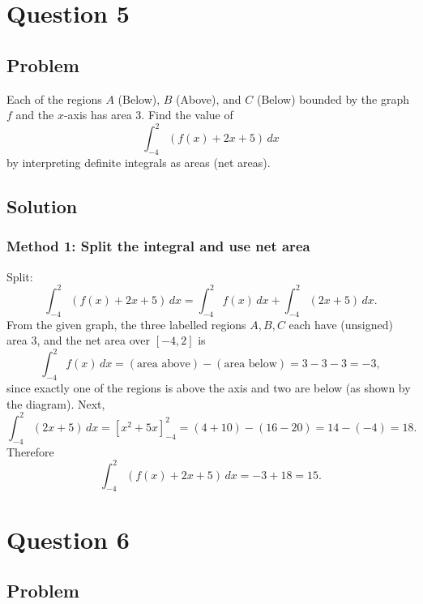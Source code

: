 \documentclass[12pt]{article}
\begin{document}
\bigskip


\newpage

\section*{Question 5}

\subsection*{Problem}

Each of the regions \(A\) (Below), \(B\) (Above), and \(C\) (Below) bounded by the graph \(f\) and the \(x\)-axis has area \(3\).
Find the value of
\[
\int_{-4}^{2} \left(f(x) + 2x + 5\right)\,dx
\]
by interpreting definite integrals as areas (net areas).

\subsection*{Solution}

\subsubsection*{Method 1: Split the integral and use net area}

Split:
\[
\int_{-4}^{2}\left(f(x)+2x+5\right)\,dx
=\int_{-4}^{2} f(x)\,dx + \int_{-4}^{2}(2x+5)\,dx.
\]
From the given graph, the three labelled regions \(A,B,C\) each have (unsigned) area \(3\), and the net area over \([-4,2]\) is
\[
\int_{-4}^{2} f(x)\,dx = (\text{area above})-(\text{area below})=3-3-3=-3,
\]
since exactly one of the regions is above the axis and two are below (as shown by the diagram).
Next,
\[
\int_{-4}^{2}(2x+5)\,dx = \left[x^2+5x\right]_{-4}^{2} = (4+10)-(16-20)=14-(-4)=18.
\]
Therefore
\[
\int_{-4}^{2} \left(f(x) + 2x + 5\right)\,dx = -3+18 = 15.
\]

\bigskip


\newpage

\section*{Question 6}

\subsection*{Problem}
\end{document}
